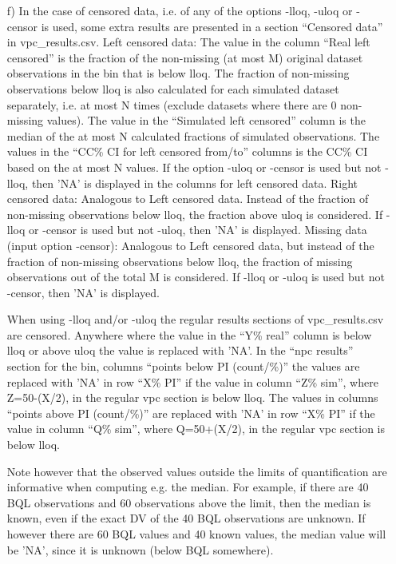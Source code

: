 \begin{itemize}
	\item[f)] In the case of censored data, i.e. of any of the options -lloq, -uloq or -censor is used, some extra results are presented in a section “Censored data” in vpc\_results.csv. 
Left censored data: The value in the column “Real left censored” is the fraction of the non-missing (at most M) original dataset observations in the bin that is below lloq. The fraction of non-missing observations below lloq is also calculated for each simulated dataset separately, i.e. at most N times (exclude datasets where there are 0 non-missing values). The value in the “Simulated left censored” column is the median of the at most N calculated fractions of simulated observations. The values in the “CC\% CI for left censored from/to” columns is the CC\% CI based on the at most N values. If the option -uloq or -censor is used but not -lloq, then 'NA' is displayed in the columns for left censored data.
Right censored data: Analogous to Left censored data. Instead of the fraction of non-missing observations below lloq, the fraction above uloq is considered. If -lloq or -censor is used but not -uloq, then 'NA' is displayed.
Missing data (input option -censor): Analogous to Left censored data, but instead of the fraction of non-missing observations below lloq, the fraction of missing observations out of the total M is considered. If -lloq or -uloq is used but not -censor, then 'NA' is displayed.

When using -lloq and/or -uloq the 
regular results sections of vpc\_results.csv are censored.
Anywhere where the value in the “Y\% real” column is below lloq or above uloq the value is replaced with 'NA'. In the “npc results” section for the bin, columns “points below PI (count/\%)” the values are replaced with 'NA' in row “X\% PI” if the value in column “Z\% sim”, where Z=50-(X/2), in the regular vpc section is below lloq. The values in columns “points above PI (count/\%)” are replaced with 'NA' in row “X\% PI” if the value in column “Q\% sim”, where Q=50+(X/2), in the regular vpc section is below lloq.

Note however that the observed values outside the
limits of quantification are informative when computing e.g. the median.
For example, if there are 40 BQL observations 
and 60 observations above the limit,
then the median is known, even if the exact DV of the
40 BQL observations are unknown. If however there are 60 BQL values and
40 known values, the median value will be 'NA',
since it is unknown (below BQL somewhere).


\end{itemize}
